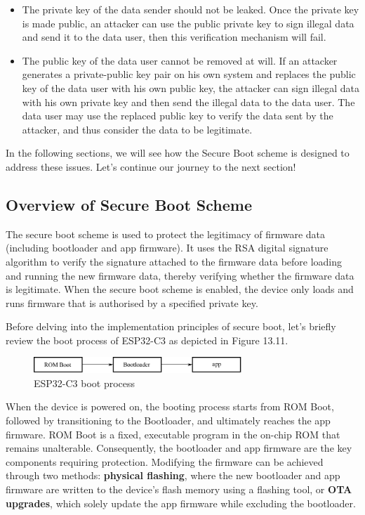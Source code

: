 \documentclass[a4paper,12pt,openany]{book}
\begin{document}
\begin{itemize}[leftmargin=1.5em]
    \item The private key of the data sender should not be leaked. Once the private key is made public, an attacker can use the public private key to sign illegal data and send it to the data user, then this verification mechanism will fail.
    \item The public key of the data user cannot be removed at will. If an attacker generates a private-public key pair on his own system and replaces the public key of the data user with his own public key, the attacker can sign illegal data with his own private key and then send the illegal data to the data user. The data user may use the replaced public key to verify the data sent by the attacker, and thus consider the data to be legitimate.
\end{itemize}

In the following sections, we will see how the Secure Boot scheme is designed to address these issues. Let’s continue our journey to the next section!

\subsection{Overview of Secure Boot Scheme}
The secure boot scheme is used to protect the legitimacy of firmware data (including bootloader and app firmware). It uses the RSA digital signature algorithm to verify the signature attached to the firmware data before loading and running the new firmware data, thereby verifying whether the firmware data is legitimate. When the secure boot scheme is enabled, the device only loads and runs firmware that is authorised by a specified private key.

Before delving into the implementation principles of secure boot, let’s briefly review the boot process of ESP32-C3 as depicted in Figure 13.11.

\begin{figure}[!h]
    \centering
    \includegraphics[width=0.7\textwidth]{D13Z/13-11}
    \caption{ESP32-C3 boot process}
\end{figure}

When the device is powered on, the booting process starts from ROM Boot, followed by transitioning to the Bootloader, and ultimately reaches the app firmware. ROM Boot is a fixed, executable program in the on-chip ROM that remains unalterable. Consequently, the bootloader and app firmware are the key components requiring protection. Modifying the firmware can be achieved through two methods: \textbf{physical flashing}, where the new bootloader and app firmware are written to the device’s flash memory using a flashing tool, or \textbf{OTA upgrades}, which solely update the app firmware while excluding the bootloader.
\end{document}
